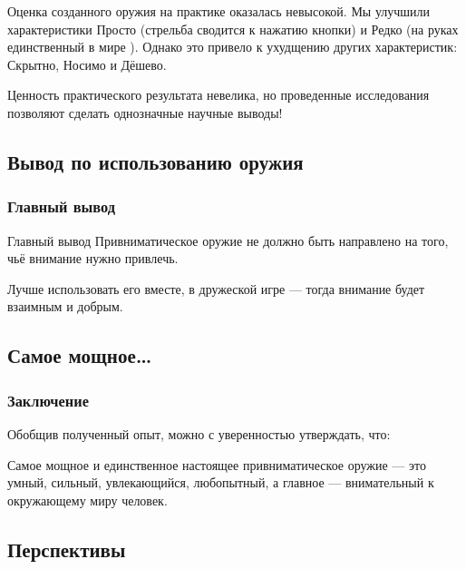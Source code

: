 Оценка созданного оружия на практике оказалась невысокой. Мы улучшили характеристики \alert{Просто} (стрельба сводится к нажатию кнопки) и \alert{Редко} (на руках единственный в мире {\myDevice}). Однако это привело к ухудщению других характеристик: Скрытно, Носимо и Дёшево.

Ценность практического результата невелика, но проведенные исследования позволяют сделать однозначные научные выводы!


\subsection{Вывод по использованию оружия}

\begin{frame}
    \frametitle{Главный вывод}
    
    \begin{block}{Главный вывод}
        Привниматическое оружие \alert{не должно} быть направлено на того, чьё внимание нужно привлечь. 
    \end{block}
    
    \par\bigskip
    
    Лучше использовать его вместе, в дружеской игре --- тогда внимание будет \alert{взаимным} и \alert{добрым}.
\end{frame}


\subsection{Самое мощное\ldots}

\begin{frame}
    \frametitle{Заключение}
    
    Обобщив полученный опыт, можно с уверенностью утверждать, что:
    
    \begin{block}{}
        Самое мощное и \alert{единственное настоящее} привниматическое оружие --- это умный, сильный, увлекающийся, любопытный, а главное --- \alert{внимательный к окружающему миру} человек.
    \end{block}
\end{frame}

    
\subsection{Перспективы}

